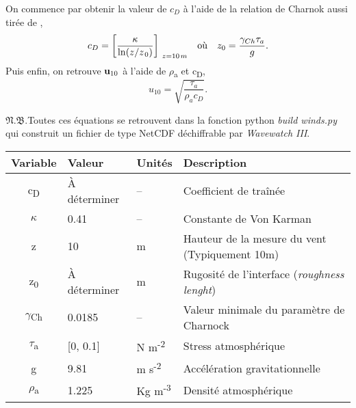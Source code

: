 \documentclass[10pt]{report}
\numberwithin{equation}{section}
\newcommand{\pt}{\hspace{1pt}} %
\newcommand{\nb}{\underline{{\footnotesize\EightStarConvex}\pt $\mathfrak{N.B.}$\vphantom{p}}\hspace{3pt}}
\begin{document}
On commence par obtenir la valeur de \(c_D\) à l'aide de la relation de Charnok \autocite{charnock1955wind} aussi tirée de \Textcite[p.30]{gill-atmosphere-ocean},
\begin{align}
\label{eq:orgf49269f}
   &&c_D = \qty[\frac{\kappa}{\ln(z/z_{\pt0})}]_{\ z=10\pt m}
   && \text{où} &&
   z_0 = \frac{\gamma_{Ch}\tau_a}{g}. &&
\end{align}
Puis enfin, on retrouve \(\vb{u}_{10}\) à l'aide de \(\rho\)\textsubscript{a} et c\textsubscript{D},
\begin{equation}
   u_{10} = \sqrt{\frac{\tau_a}{\rho_a c_D}}.
\end{equation}

\nb Toutes ces équations se retrouvent dans la fonction python \emph{build winds.py} qui construit un fichier de type NetCDF déchiffrable par \emph{Wavewatch III}.
\begin{center}
\begin{tabular}{clll}
Variable & Valeur & Unités & Description\\[0pt]
\hline
c\textsubscript{D} & À déterminer & -- & Coefficient de traînée\\[0pt]
\(\kappa\) & 0.41 & -- & Constante de Von Karman\\[0pt]
z & 10 & m & Hauteur de la mesure du vent (Typiquement 10m)\\[0pt]
z\textsubscript{0} & À déterminer & m & Rugosité de l'interface (\emph{roughness lenght})\\[0pt]
\(\gamma\)\textsubscript{Ch} & 0.0185 & -- & Valeur minimale du paramètre de Charnock\\[0pt]
\(\tau\)\textsubscript{a} & [0, 0.1] & N m\textsuperscript{-2} & Stress atmosphérique\\[0pt]
g & 9.81 & m s\textsuperscript{-2} & Accélération gravitationnelle\\[0pt]
\(\rho\)\textsubscript{a} & 1.225 & Kg m\textsuperscript{-3} & Densité atmosphérique\\[0pt]
\end{tabular}
\end{center}
\end{document}
